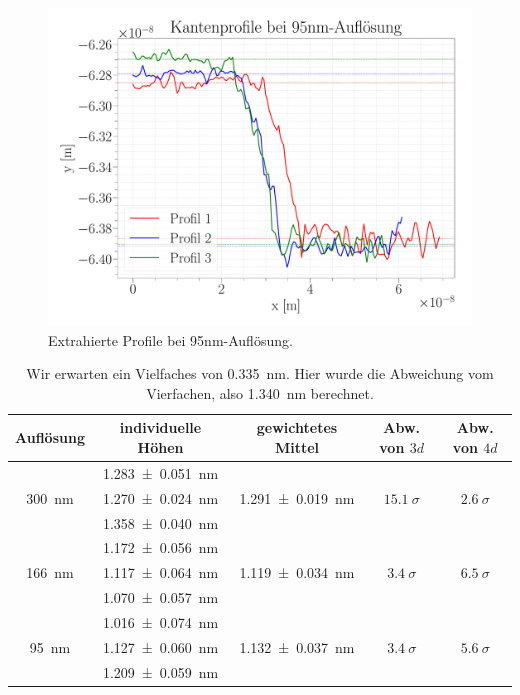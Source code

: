 \begin{figure}[H]
\centering
\includegraphics[width=\textwidth]{../Figures/95nm_profiles.pdf}
\caption{Extrahierte Profile bei {95}{nm}-Auflösung.}
\label{95nmProfiles}
\end{figure}

\begin{table}[H]
	\renewcommand{\arraystretch}{1.5}
	\centering
	\begin{tabular}{|c|c|c|c|c|}
		\hline
		Auflösung & individuelle Höhen & gewichtetes Mittel & Abw. von $3d$ & Abw. von $4d$\\
		\hline
		\multirow{3}{*}{\SI{300}{nm}} & \SI{1.283+-0.051}{nm} & \multirow{3}{*}{\SI{1.291+-0.019}{nm}} & \multirow{3}{*}{$\SI{15,1}{\sigma}$} & \multirow{3}{*}{$\SI{2,6}{\sigma}$} \\
		 & \SI{1.270+-0.024}{nm} & & & \\
		 & \SI{1.358+-0.040}{nm} & & & \\
		\hline
		\multirow{3}{*}{\SI{166}{nm}} & \SI{1.172+-0.056}{nm} & \multirow{3}{*}{\SI{1,119+-0,034}{nm}} & \multirow{3}{*}{$\SI{3,4}{\sigma}$} & \multirow{3}{*}{$\SI{6,5}{\sigma}$} \\
		 & \SI{1.117+-0.064}{nm} & & & \\
		 & \SI{1.070+-0.057}{nm} & & & \\
		\hline
		\multirow{3}{*}{\SI{95}{nm}} & \SI{1.016+-0.074}{nm} & \multirow{3}{*}{\SI{1,132+-0,037}{nm}} & \multirow{3}{*}{$\SI{3,4}{\sigma}$} & \multirow{3}{*}{$\SI{5,6}{\sigma}$} \\
		 & \SI{1.127+-0.060}{nm} & & & \\
		 & \SI{1.209+-0.059}{nm} & & & \\
		\hline
	\end{tabular}
	\caption{Wir erwarten ein Vielfaches von \SI{0,335}{nm}. Hier wurde die Abweichung vom Vierfachen, also \SI{1,340}{nm} berechnet.}
	\label{tab:heights}
\end{table}

